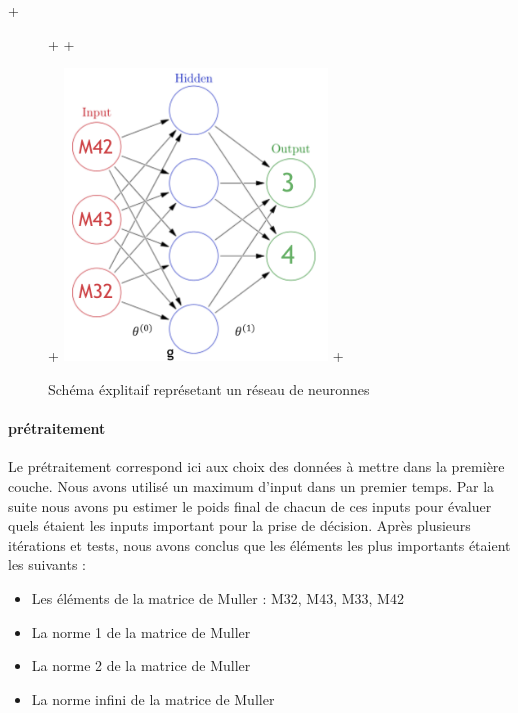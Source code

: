 \documentclass[a4paper,10pt]{report}
\begin{document}
+\begin{figure}[H]
 +  \centering  
 +  \caption{Schéma éxplitaif représetant un réseau de neuronnes}
 +  \includegraphics[width=7cm]{nn_explanation.png}
 +\end{figure}

\paragraph{prétraitement}
Le prétraitement correspond ici aux choix des données à mettre dans la première couche. Nous avons utilisé un maximum d'input dans un premier temps. Par la suite nous avons pu estimer le poids final de chacun de  ces inputs pour évaluer quels étaient les inputs important pour la prise de décision. Après plusieurs itérations et tests, nous avons conclus que les éléments les plus importants étaient les suivants :

\begin{itemize}

    \item Les éléments de la matrice de Muller : M32, 	M43, M33, M42

    \item La norme 1 de la matrice de Muller 
    
    \item La norme 2 de la matrice de Muller 

    \item La norme infini de la matrice de Muller  

\end{itemize}
\end{document}
